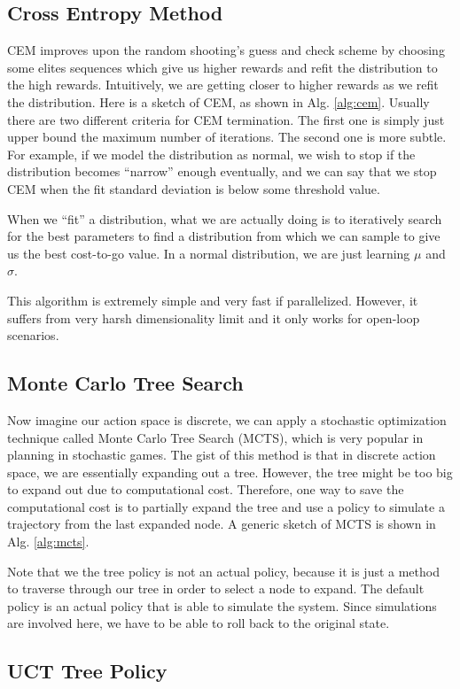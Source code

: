 \subsection{Cross Entropy Method}
CEM improves upon the random shooting's guess and check scheme by choosing some elites sequences which give us higher rewards and refit the distribution to the high rewards. Intuitively, we are getting closer to higher rewards as we refit the distribution. Here is a sketch of CEM, as shown in Alg. \ref{alg:cem}. Usually there are two different criteria for CEM termination. The first one is simply just upper bound the maximum number of iterations. The second one is more subtle. For example, if we model the distribution as normal, we wish to stop if the distribution becomes ``narrow'' enough eventually, and we can say that we stop CEM when the fit standard deviation is below some threshold value. 

When we ``fit'' a distribution, what we are actually doing is to iteratively search for the best parameters to find a distribution from which we can sample to give us the best cost-to-go value. In a normal distribution, we are just learning $\mu$ and $\sigma$.

This algorithm is extremely simple and very fast if parallelized. However, it suffers from very harsh dimensionality limit and it only works for open-loop scenarios. 
\subsection{Monte Carlo Tree Search}
Now imagine our action space is discrete, we can apply a stochastic optimization technique called Monte Carlo Tree Search (MCTS), which is very popular in planning in stochastic games. The gist of this method is that in discrete action space, we are essentially expanding out a tree. However, the tree might be too big to expand out due to computational cost. Therefore, one way to save the computational cost is to partially expand the tree and use a policy to simulate a trajectory from the last expanded node. A generic sketch of MCTS is shown in Alg. \ref{alg:mcts}.

Note that we the tree policy is not an actual policy, because it is just a method to traverse through our tree in order to select a node to expand. The default policy is an actual policy that is able to simulate the system. Since simulations are involved here, we have to be able to roll back to the original state.
\subsection{UCT Tree Policy}

